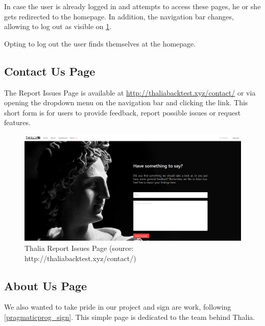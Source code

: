 \documentclass[main.tex]{subfiles}
\begin{document}
In case the user is already logged in and attempts to access these pages, he or she gets redirected to the homepage. In addition, the navigation bar changes, allowing to log out as visible on \figurename{\ref{thalia_issues}}.

Opting to log out the user finds themselves at the homepage.



\subsection{Contact Us Page}



The Report Issues Page is available at \url{http://thaliabacktest.xyz/contact/} or via opening the dropdown menu on the navigation bar and clicking the link. This short form is for users to provide feedback, report possible issues or request features.



\begin{figure}[H]

   \centering

   \includegraphics[width=\textwidth]{08Appendices/081User/081Pictures/issues.png}

   \caption{Thalia Report Issues Page (source: http://thaliabacktest.xyz/contact/)}

   \label{thalia_issues}

\end{figure}



\subsection{About Us Page}



We also wanted to take pride in our project and sign are work, following \ref{pragmaticprog_sign}. This simple page is dedicated to the team behind Thalia.
\end{document}

